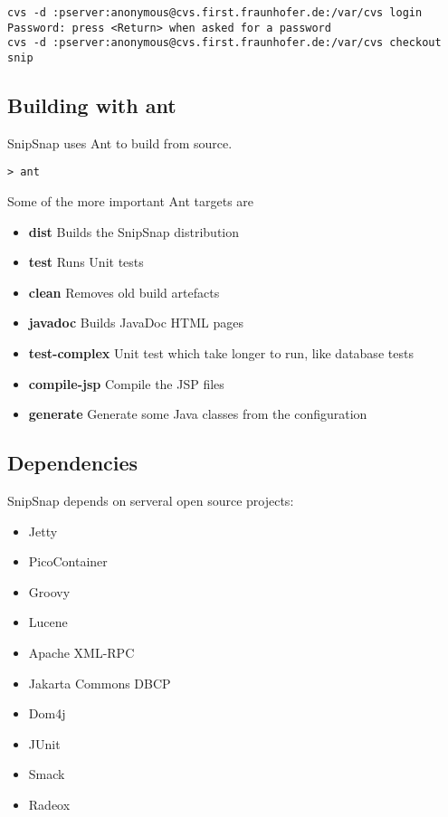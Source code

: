 \documentclass[a4paper,pdftex]{article}
\begin{document}
\begin{verbatim}
cvs -d :pserver:anonymous@cvs.first.fraunhofer.de:/var/cvs login
Password: press <Return> when asked for a password
cvs -d :pserver:anonymous@cvs.first.fraunhofer.de:/var/cvs checkout snip
\end{verbatim}

\subsection{Building with ant}

SnipSnap uses Ant\cite{Ant} to build from source. 

\begin{verbatim}
> ant
\end{verbatim}

Some of the more important Ant targets are
\begin{itemize}
\item \textbf{dist} Builds the SnipSnap distribution
\item \textbf{test} Runs Unit tests
\item \textbf{clean} Removes old build artefacts
\item \textbf{javadoc} Builds JavaDoc HTML pages
\item \textbf{test-complex} Unit test which take longer to run, like database tests
\item \textbf{compile-jsp} Compile the JSP files
\item \textbf{generate} Generate some Java classes from the configuration
\end{itemize}

\subsection{Dependencies}

SnipSnap depends on serveral open source projects:

\begin{itemize}
\item Jetty \cite{Jetty}
\item PicoContainer\cite{PicoContainer}
\item Groovy\cite{Groovy}
\item Lucene \cite{Lucene}
\item Apache XML-RPC \cite{ApacheXmlRpc}
\item Jakarta Commons DBCP \cite{JakartaDBCP}
\item Dom4j \cite{Dom4j}
\item JUnit \cite{JUnit}
\item Smack \cite{Smack}
\item Radeox \cite{Radeox}
\end{itemize}
\end{document}
